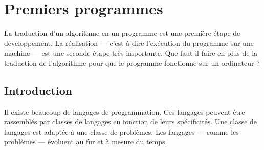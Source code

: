 \chapter{Premiers programmes}

La traduction d'un algorithme en un programme est une première étape de
développement. La réalisation — c'est-à-dire l'exécution du programme sur une
machine — est une seconde étape très importante. Que faut-il faire en plus de la
traduction de l'algorithme pour que le programme fonctionne sur un ordinateur ? 

\minitoc

%
%
%
%
\section{Introduction}

Il existe beaucoup de langages de programmation. Ces langages peuvent être
rassemblés par classes de langages en fonction de leurs spécificités. Une classe
de langages est adaptée à une classe de problèmes. Les langages — comme les 
problèmes — évoluent au fur et à mesure du temps. 

